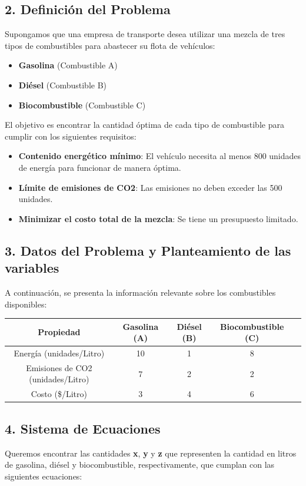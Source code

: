 \documentclass[]{article}
\begin{document}
	\subsection*{2. Definición del Problema}
	Supongamos que una empresa de transporte desea utilizar una mezcla de tres tipos de combustibles para abastecer su flota de vehículos:
	
	\begin{itemize}
		\item \textbf{Gasolina} (Combustible A)
		\item \textbf{Diésel} (Combustible B)
		\item \textbf{Biocombustible} (Combustible C)
	\end{itemize}
	
	El objetivo es encontrar la cantidad óptima de cada tipo de combustible para cumplir con los siguientes requisitos:
	\begin{itemize}
		\item \textbf{Contenido energético mínimo}: El vehículo necesita al menos 800 unidades de energía para funcionar de manera óptima.
		\item \textbf{Límite de emisiones de CO2}: Las emisiones no deben exceder las 500 unidades.
		\item \textbf{Minimizar el costo total de la mezcla}: Se tiene un presupuesto limitado.
	\end{itemize}
	
	\subsection*{3. Datos del Problema y Planteamiento de las variables}
	A continuación, se presenta la información relevante sobre los combustibles disponibles:
	
	\begin{center}
		\begin{tabular}{|c|c|c|c|c|}
			\hline
			Propiedad & Gasolina (A) & Diésel (B) & Biocombustible (C) \\
			\hline
			Energía (unidades/Litro) & 10 & 1 & 8 \\
			\hline
			Emisiones de CO2 (unidades/Litro) & 7 & 2 & 2 \\
			\hline
			Costo (\$/Litro) & 3 & 4 & 6 \\
			\hline
		\end{tabular}
	\end{center}
	
	\subsection*{4. Sistema de Ecuaciones}
	Queremos encontrar las cantidades \textbf{x}, \textbf{y} y \textbf{z} que representen la cantidad en litros de gasolina, diésel y biocombustible, respectivamente, que cumplan con las siguientes ecuaciones:
	
\end{document}

